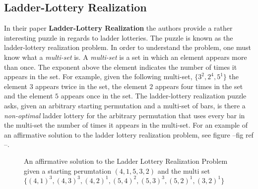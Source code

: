 

\subsection{Ladder-Lottery Realization}

In their paper \textbf{Ladder-Lottery Realization} the authors provide 
a rather interesting puzzle in regards to ladder lotteries. The puzzle 
is known as the ladder-lottery realization problem. In order to understand
the problem, one must know what a \emph{multi-set} is. A \emph{multi-set}
is a set in which an element appears more than once. The exponent 
above the element indicates the number of times it appears in the set.
For example, given the following multi-set, $\{3^{2}, 2^{4}, 5^{1}\}$ 
the element $3$ appears twice in the set, the element $2$ appears four times
in the set and the element $5$ appears once in the set.
The ladder-lottery realization puzzle asks, given an arbitrary starting permutation 
and a multi-set of bars, 
is there a \emph{non-optimal} ladder lottery for the arbitrary permutation
that uses every bar in the multi-set the number 
of times it appears in the  multi-set. 
For an example of an affirmative solution to the ladder lottery realization problem, see figure --fig ref --.


\begin{figure}[!htp]
    \begin{center}
    \end{center}
      


    \caption{An affirmative solution to the Ladder Lottery Realization Problem
    given a starting perumtation $(4,1,5,3,2)$ and the multi set 
    $\{(4,1)^{3}, (4,3)^{3}, (4,2)^{1}, (5,4)^{2}, (5,3)^{3}, (5,2)^{1},(3,2)^{1}\}$}
\end{figure}